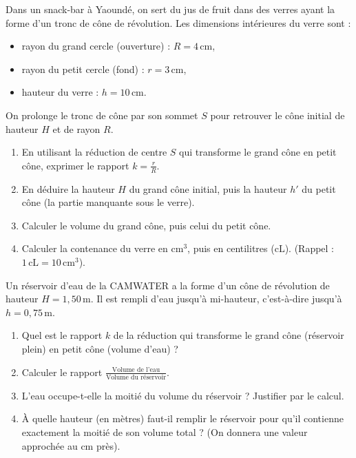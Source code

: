 \documentclass[11pt]{article}
\begin{document}
\begin{exercice}
Dans un snack-bar à Yaoundé, on sert du jus de fruit dans des verres ayant la forme d'un tronc de cône de révolution.
Les dimensions intérieures du verre sont :
\begin{itemize}
    \item rayon du grand cercle (ouverture) : $R = 4\,\text{cm}$,
    \item rayon du petit cercle (fond) : $r = 3\,\text{cm}$,
    \item hauteur du verre : $h = 10\,\text{cm}$.
\end{itemize}
On prolonge le tronc de cône par son sommet $S$ pour retrouver le cône initial de hauteur $H$ et de rayon $R$.
\begin{enumerate}
    \item En utilisant la réduction de centre $S$ qui transforme le grand cône en petit cône, exprimer le rapport $k = \frac{r}{R}$.
    \item En déduire la hauteur $H$ du grand cône initial, puis la hauteur $h'$ du petit cône (la partie manquante sous le verre).
    \item Calculer le volume du grand cône, puis celui du petit cône.
    \item Calculer la contenance du verre en $\text{cm}^3$, puis en centilitres ($\text{cL}$). (Rappel : $1\,\text{cL} = 10\,\text{cm}^3$).
\end{enumerate}
\end{exercice}

\begin{exercice}
Un réservoir d'eau de la CAMWATER a la forme d'un cône de révolution de hauteur $H = 1,50\,\text{m}$. Il est rempli d'eau jusqu'à mi-hauteur, c'est-à-dire jusqu'à $h = 0,75\,\text{m}$.
\begin{enumerate}
    \item Quel est le rapport $k$ de la réduction qui transforme le grand cône (réservoir plein) en petit cône (volume d'eau) ?
    \item Calculer le rapport $\frac{\text{Volume de l'eau}}{\text{Volume du réservoir}}$.
    \item L'eau occupe-t-elle la moitié du volume du réservoir ? Justifier par le calcul.
    \item À quelle hauteur (en mètres) faut-il remplir le réservoir pour qu'il contienne exactement la moitié de son volume total ? (On donnera une valeur approchée au cm près).
\end{enumerate}
\end{exercice}
\end{document}
